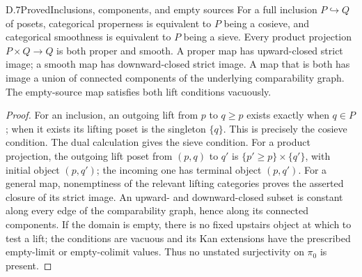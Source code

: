 \begin{statement}{D.7}{Proved}{Inclusions, components, and empty sources}
For a full inclusion $P\hookrightarrow Q$ of posets, categorical properness is equivalent to $P$ being a cosieve, and categorical smoothness is equivalent to $P$ being a sieve. Every product projection $P\times Q\to Q$ is both proper and smooth. A proper map has upward-closed strict image; a smooth map has downward-closed strict image. A map that is both has image a union of connected components of the underlying comparability graph. The empty-source map satisfies both lift conditions vacuously.
\end{statement}
\begin{proof}
For an inclusion, an outgoing lift from $p$ to $q\geq p$ exists exactly when $q\in P$; when it exists its lifting poset is the singleton $\{q\}$. This is precisely the cosieve condition. The dual calculation gives the sieve condition. For a product projection, the outgoing lift poset from $(p,q)$ to $q'$ is $\{p'\geq p\}\times\{q'\}$, with initial object $(p,q')$; the incoming one has terminal object $(p,q')$. For a general map, nonemptiness of the relevant lifting categories proves the asserted closure of its strict image. An upward- and downward-closed subset is constant along every edge of the comparability graph, hence along its connected components. If the domain is empty, there is no fixed upstairs object at which to test a lift; the conditions are vacuous and its Kan extensions have the prescribed empty-limit or empty-colimit values. Thus no unstated surjectivity on $\pi_0$ is present.
\end{proof}

